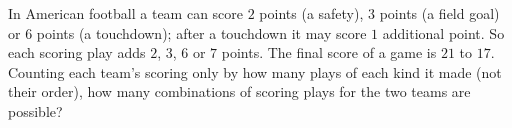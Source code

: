 In American football a team can score $2$ points (a safety), $3$ points (a field goal) or $6$ points (a touchdown); after a touchdown it may score $1$ additional point. So each scoring play adds $2$, $3$, $6$ or $7$ points. The final score of a game is $21$ to $17$. Counting each team's scoring only by how many plays of each kind it made (not their order), how many combinations of scoring plays for the two teams are possible?
